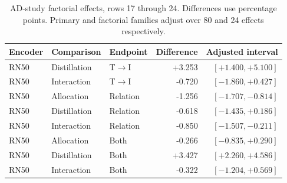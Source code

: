 \begin{table}[t]
\centering
\small
\setlength{\tabcolsep}{3pt}
\begin{tabular}{lllrr}
\toprule
Encoder & Comparison & Endpoint & Difference & Adjusted interval\\
\midrule
RN50 & Distillation & T$\to$I & +3.253 & $[+1.400,+5.100]$ \\
RN50 & Interaction & T$\to$I & -0.720 & $[-1.860,+0.427]$ \\
RN50 & Allocation & Relation & -1.256 & $[-1.707,-0.814]$ \\
RN50 & Distillation & Relation & -0.618 & $[-1.435,+0.186]$ \\
RN50 & Interaction & Relation & -0.850 & $[-1.507,-0.211]$ \\
RN50 & Allocation & Both & -0.266 & $[-0.835,+0.290]$ \\
RN50 & Distillation & Both & +3.427 & $[+2.260,+4.586]$ \\
RN50 & Interaction & Both & -0.322 & $[-1.204,+0.569]$ \\
\bottomrule
\end{tabular}
\caption{AD-study factorial effects, rows 17 through 24. Differences use percentage points. Primary and factorial families adjust over 80 and 24 effects respectively.}\label{tab:adfactorial16}
\end{table}


